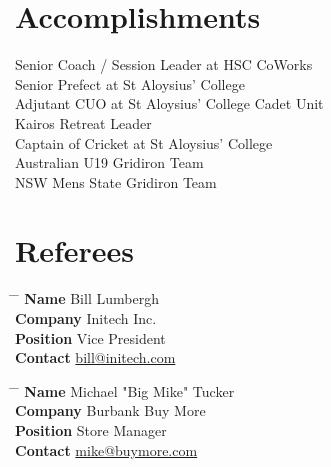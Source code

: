 \documentclass[10pt]{article} %
\begin{document}

\section{Accomplishments}
{
	{
		Senior Coach / Session Leader at HSC CoWorks\\
	}
	{
		Senior Prefect at St Aloysius' College\\
		Adjutant CUO at St Aloysius' College Cadet Unit\\
		Kairos Retreat Leader\\
	}
	{
		Captain of Cricket at St Aloysius' College\\
		Australian U19 Gridiron Team\\
		NSW Mens State Gridiron Team\\
	}
}


\section{Referees}

\parbox{0.5\textwidth}{ %
\begin{tabbing}
\hspace{2.75cm} \= \hspace{4cm} \= \kill %
{\bf Name} \> Bill Lumbergh \\ %
{\bf Company} \> Initech Inc. \\ %
{\bf Position} \> Vice President \\ %
{\bf Contact} \> \href{mailto:bill@initech.com}{bill@initech.com} %
\end{tabbing}}
\hfill %
\parbox{0.5\textwidth}{ %
\begin{tabbing}
\hspace{2.75cm} \= \hspace{4cm} \= \kill %
{\bf Name} \> Michael "Big Mike" Tucker\\ %
{\bf Company} \> Burbank Buy More \\ %
{\bf Position} \> Store Manager \\ %
{\bf Contact} \> \href{mailto:mike@buymore.com}{mike@buymore.com} %
\end{tabbing}}

\end{document}
